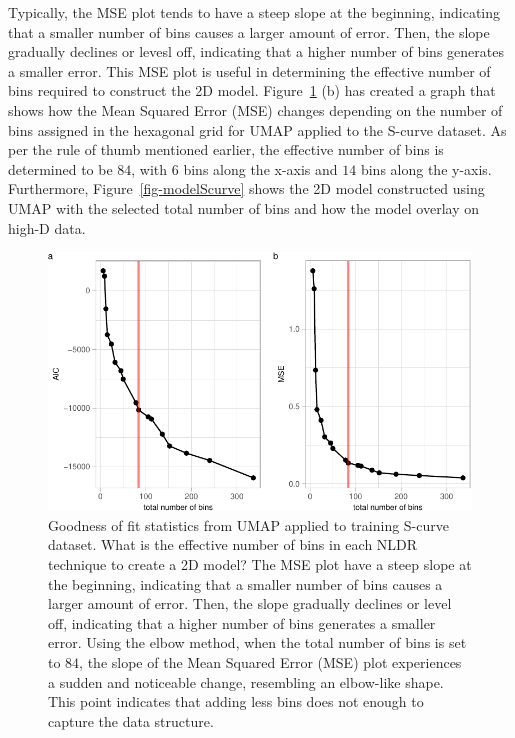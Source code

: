 \documentclass[
  12pt]{article}
\begin{document}
Typically, the MSE plot tends to have a steep slope at the beginning,
indicating that a smaller number of bins causes a larger amount of
error. Then, the slope gradually declines or levesl off, indicating that
a higher number of bins generates a smaller error. This MSE plot is
useful in determining the effective number of bins required to construct
the 2D model. Figure~\ref{fig-diagnosticpltScurve} (b) has created a
graph that shows how the Mean Squared Error (MSE) changes depending on
the number of bins assigned in the hexagonal grid for UMAP applied to
the S-curve dataset. As per the rule of thumb mentioned earlier, the
effective number of bins is determined to be \(84\), with \(6\) bins
along the x-axis and \(14\) bins along the y-axis. Furthermore,
Figure~\ref{fig-modelScurve} shows the 2D model constructed using UMAP
with the selected total number of bins and how the model overlay on
high-D data.

\begin{figure}

{\centering \includegraphics{paper_files/figure-pdf/fig-diagnosticpltScurve-1.pdf}

}

\caption{\label{fig-diagnosticpltScurve}Goodness of fit statistics from
UMAP applied to training S-curve dataset. What is the effective number
of bins in each NLDR technique to create a 2D model? The MSE plot have a
steep slope at the beginning, indicating that a smaller number of bins
causes a larger amount of error. Then, the slope gradually declines or
level off, indicating that a higher number of bins generates a smaller
error. Using the elbow method, when the total number of bins is set to
\(84\), the slope of the Mean Squared Error (MSE) plot experiences a
sudden and noticeable change, resembling an elbow-like shape. This point
indicates that adding less bins does not enough to capture the data
structure.}

\end{figure}
\end{document}
